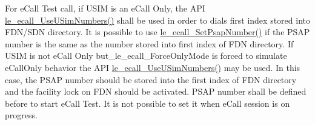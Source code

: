 For e\+Call Test call, if U\+S\+IM is an e\+Call Only, the A\+PI \hyperlink{le__ecall__interface_8h_a034c442fd7c6650ed956822a561c0104}{le\+\_\+ecall\+\_\+\+Use\+U\+Sim\+Numbers()} shall be used in order to dials first index stored into F\+D\+N/\+S\+DN directory. It is possible to use \hyperlink{le__ecall__interface_8h_abf9c09914c55cdbe72df1433f60f6e51}{le\+\_\+ecall\+\_\+\+Set\+Psap\+Number()} if the P\+S\+AP number is the same as the number stored into first index of F\+DN directory. If U\+S\+IM is not e\+Call Only but\+\_\+le\+\_\+ecall\+\_\+\+Force\+Only\+Mode is forced to simulate e\+Call\+Only behavior the A\+PI \hyperlink{le__ecall__interface_8h_a034c442fd7c6650ed956822a561c0104}{le\+\_\+ecall\+\_\+\+Use\+U\+Sim\+Numbers()} may be used. In this case, the P\+S\+AP number should be stored into the first index of F\+DN directory and the facility lock on F\+DN should be activated. P\+S\+AP number shall be defined before to start e\+Call Test. It is not possible to set it when e\+Call session is on progress.


